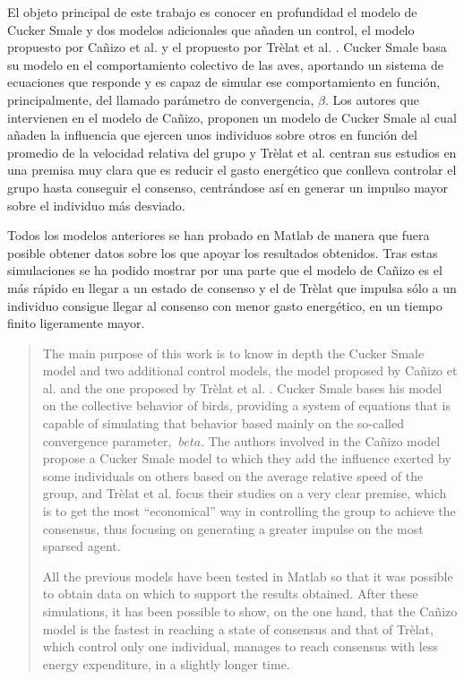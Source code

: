 \begin{resumen}

El objeto principal de este trabajo es conocer en profundidad el modelo de Cucker Smale y dos modelos adicionales que añaden un control, el modelo propuesto por Cañizo et al. \cite{canizo2010collective} y el propuesto por Trèlat et al. \cite{caponigro2015sparse}. Cucker Smale basa su modelo en el comportamiento colectivo de las aves, aportando un sistema de ecuaciones que responde y es capaz de simular ese comportamiento en función, principalmente, del llamado parámetro de convergencia, $\beta$. Los autores que intervienen en el modelo de Cañizo, proponen un modelo de Cucker Smale al cual añaden la influencia que ejercen unos individuos sobre otros en función del promedio de la velocidad relativa del grupo y Trèlat et al. centran sus estudios en una premisa muy clara que es reducir el gasto energético que conlleva controlar el grupo hasta conseguir el consenso, centrándose así en generar un impulso mayor sobre el individuo más desviado.

Todos los modelos anteriores se han probado en Matlab de manera que fuera posible obtener datos sobre los que apoyar los resultados obtenidos. Tras estas simulaciones se ha podido mostrar por una parte que el modelo de Cañizo es el más rápido en llegar a un estado de consenso y el de Trèlat que impulsa sólo a un individuo consigue llegar al consenso con menor gasto energético, en un tiempo finito ligeramente mayor. 
\end{resumen}

\begin{abstract}
The main purpose of this work is to know in depth the Cucker Smale model and two additional control models, the model proposed by Cañizo et al. \cite{canizo2010collective} and the one proposed by Trèlat et al. \cite{caponigro2015sparse}. Cucker Smale bases his model on the collective behavior of birds, providing a system of equations that is capable of simulating that behavior based mainly on the so-called convergence parameter, $ \ beta $. The authors involved in the Cañizo model propose a Cucker Smale model to which they add the influence exerted by some individuals on others based on the average relative speed of the group, and Trèlat et al. focus their studies on a very clear premise, which is to get the most ``economical'' way in controlling the group to achieve the consensus, thus focusing on generating a greater impulse on the most sparsed agent.

All the previous models have been tested in Matlab so that it was possible to obtain data on which to support the results obtained. After these simulations, it has been possible to show, on the one hand, that the Cañizo model is the fastest in reaching a state of consensus and that of Trèlat, which control only one individual, manages to reach consensus with less energy expenditure, in a slightly longer time.
\end{abstract}
